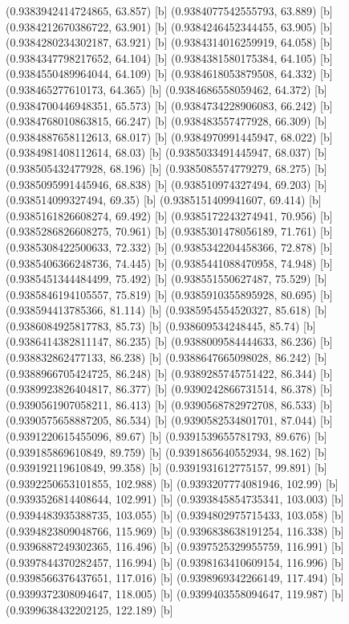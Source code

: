 {{{(0.9383942414724865, 63.857) [b] 
(0.9384077542555793, 63.889) [b] 
(0.9384212670386722, 63.901) [b] 
(0.9384246452344455, 63.905) [b] 
(0.9384280234302187, 63.921) [b] 
(0.9384314016259919, 64.058) [b] 
(0.9384347798217652, 64.104) [b] 
(0.9384381580175384, 64.105) [b] 
(0.9384550489964044, 64.109) [b] 
(0.9384618053879508, 64.332) [b] 
(0.938465277610173, 64.365) [b] 
(0.9384686558059462, 64.372) [b] 
(0.9384700446948351, 65.573) [b] 
(0.9384734228906083, 66.242) [b] 
(0.9384768010863815, 66.247) [b] 
(0.938483557477928, 66.309) [b] 
(0.9384887658112613, 68.017) [b] 
(0.9384970991445947, 68.022) [b] 
(0.9384981408112614, 68.03) [b] 
(0.9385033491445947, 68.037) [b] 
(0.938505432477928, 68.196) [b] 
(0.9385085574779279, 68.275) [b] 
(0.9385095991445946, 68.838) [b] 
(0.938510974327494, 69.203) [b] 
(0.938514099327494, 69.35) [b] 
(0.9385151409941607, 69.414) [b] 
(0.9385161826608274, 69.492) [b] 
(0.9385172243274941, 70.956) [b] 
(0.9385286826608275, 70.961) [b] 
(0.9385301478056189, 71.761) [b] 
(0.9385308422500633, 72.332) [b] 
(0.9385342204458366, 72.878) [b] 
(0.9385406366248736, 74.445) [b] 
(0.9385441088470958, 74.948) [b] 
(0.9385451344484499, 75.492) [b] 
(0.938551550627487, 75.529) [b] 
(0.9385846194105557, 75.819) [b] 
(0.9385910355895928, 80.695) [b] 
(0.938594413785366, 81.114) [b] 
(0.9385954554520327, 85.618) [b] 
(0.9386084925817783, 85.73) [b] 
(0.938609534248445, 85.74) [b] 
(0.9386414382811147, 86.235) [b] 
(0.9388009584444633, 86.236) [b] 
(0.938832862477133, 86.238) [b] 
(0.9388647665098028, 86.242) [b] 
(0.9388966705424725, 86.248) [b] 
(0.9389285745751422, 86.344) [b] 
(0.9389923826404817, 86.377) [b] 
(0.9390242866731514, 86.378) [b] 
(0.9390561907058211, 86.413) [b] 
(0.9390568782972708, 86.533) [b] 
(0.9390575658887205, 86.534) [b] 
(0.9390582534801701, 87.044) [b] 
(0.9391220615455096, 89.67) [b] 
(0.9391539655781793, 89.676) [b] 
(0.939185869610849, 89.759) [b] 
(0.9391865640552934, 98.162) [b] 
(0.939192119610849, 99.358) [b] 
(0.9391931612775157, 99.891) [b] 
(0.9392250653101855, 102.988) [b] 
(0.9393207774081946, 102.99) [b] 
(0.9393526814408644, 102.991) [b] 
(0.9393845854735341, 103.003) [b] 
(0.9394483935388735, 103.055) [b] 
(0.9394802975715433, 103.058) [b] 
(0.9394823809048766, 115.969) [b] 
(0.9396838638191254, 116.338) [b] 
(0.9396887249302365, 116.496) [b] 
(0.9397525329955759, 116.991) [b] 
(0.9397844370282457, 116.994) [b] 
(0.9398163410609154, 116.996) [b] 
(0.9398566376437651, 117.016) [b] 
(0.9398969342266149, 117.494) [b] 
(0.9399372308094647, 118.005) [b] 
(0.9399403558094647, 119.987) [b] 
(0.9399638432202125, 122.189) [b] 
}}}
